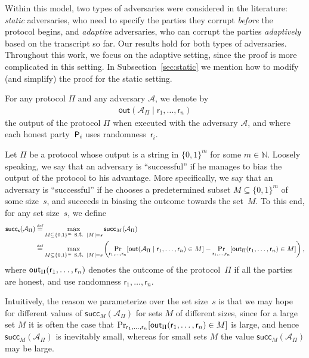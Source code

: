 \documentclass[11pt]{article}
\theoremstyle{plain}
\theoremstyle{definition}
\numberwithin{equation}{section}
\newcommand{\MyParagraph}[1]{\medskip \noindent {\bf #1}}
\renewcommand{\paragraph}{\MyParagraph}
\numberwithin{equation}{section} \newcommand{\aka} {also known as\ }
\newcommand{\eqdef} {\mathrel{\stackrel{\makebox[0pt]{\mbox{\normalfont\tiny
def}}}{=}}}
\newcommand{\N}{\mathbb N}
\newcommand{\B}{\{ 0,1 \}}
\newcommand{\1}{\mathbf{1}}
\newcommand{\Adv}{\mathcal A}
\newcommand{\sh}{{\mathsf{r}}}
\newcommand{\out}[3]{{\mathsf{out}(#2_{#1} \mid #3)}}
\newcommand{\success}{{\mathsf{succ}}}
\newcommand{\successset}{{\mathsf{succ_{s}}}}
\newcommand{\valset}[2]{{\successset(#2_{#1})}}
\newcommand{\valb}[3]{{\success_{#1}(#3_{#2})}}
\theoremstyle{remark}
\begin{document}
Within this model, two types of adversaries were considered in the literature:  {\em static} adversaries, who need to specify the parties they corrupt {\em before} the protocol begins, and {\em adaptive} adversaries, who can corrupt the parties {\em adaptively} based on the transcript so far.  Our results hold for both types of adversaries.  Throughout this work, we focus on the adaptive setting, since the proof is more complicated in this setting.  In Subsection~\ref{sec:static} we mention how to modify (and simplify) the proof for the static setting.

\paragraph{Correctness and security.}
For any protocol $\Pi$ and any adversary $\Adv$, we denote by
\begin{align*}
  \out{\Pi}{\Adv}{\sh_1,\dots,\sh_{n}}
\end{align*}
the output of the protocol $\Pi$ when executed with the adversary $\Adv$, and where each honest party~$\mathsf{P}_{{i}}$ uses randomness~$\sh_i$.


Let $\Pi$ be a protocol whose output is a string in $\{0,1\}^m$ for some
$m\in\N$. Loosely speaking, we say that an adversary is ``successful'' if he manages to bias the output of the protocol to his advantage.
More specifically,
we say that an adversary is ``successful'' if he chooses a predetermined subset $M\subseteq\{0,1\}^m$ of some size~$s$, and succeeds in biasing the outcome towards the set~$M$.  To this end, for any set size~$s$, we define
\begin{align*}
  \valset{\Pi}{\Adv} &\eqdef \max_{M\subseteq\B^m\mbox{ s.t. }|M|=s}\valb{M}{\Pi}{\Adv}\\
  &\eqdef \max_{M\subseteq\B^m\mbox{ s.t. }|M|=s}
 \left( \Pr_{\sh_1,\dots,\sh_{n}}[\out{\Pi}{\Adv}{\sh_1,\dots,\sh_{n}} \in M]-\Pr_{\sh_1,\dots,\sh_{n}}[{\sf out}_\Pi({\sh_1,\dots,\sh_{n}}) \in M]\right),
\end{align*}
where ${\sf out}_\Pi({\sh_1,\dots,\sh_{n}})$ denotes the outcome of the protocol~$\Pi$ if all the parties are honest, and use randomness ${\sh_1,\dots,\sh_{n}}$.

Intuitively, the reason we parameterize over the set size~$s$ is that we may hope for different values of $\valb{M}{\Pi}{\Adv}$ for sets $M$ of different sizes, since for a large set $M$ it is often the case that
$\Pr_{\sh_1,\dots,\sh_{n}}[{\sf out}_\Pi({\sh_1,\dots,\sh_{n}}) \in M]$ is large, and hence $\valb{M}{\Pi}{\Adv}$ is inevitably small, whereas for small sets $M$ the value $\valb{M}{\Pi}{\Adv}$ may be large.
\end{document}
